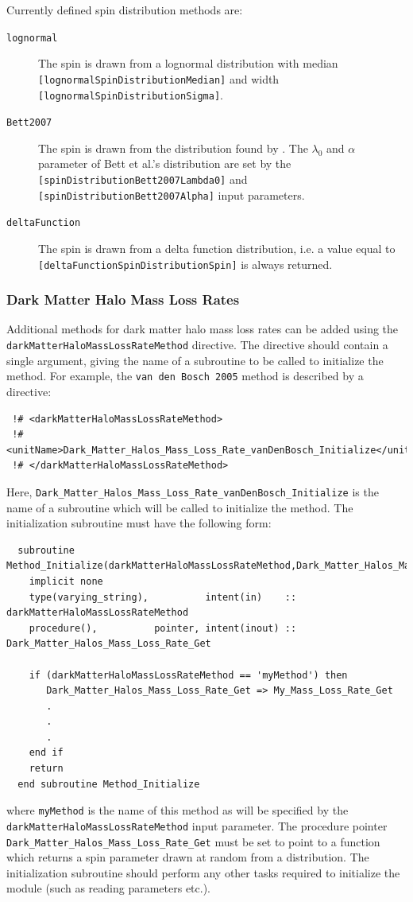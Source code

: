 Currently defined spin distribution methods are:
\begin{description}
 \item [{\tt lognormal}] The spin is drawn from a lognormal distribution with median {\tt [lognormalSpinDistributionMedian]} and width {\tt [lognormalSpinDistributionSigma]}.
 \item [{\tt Bett2007}] The spin is drawn from the distribution found by \cite{bett_spin_2007}. The $\lambda_0$ and $\alpha$ parameter of Bett et al.'s distribution are set by the {\tt [spinDistributionBett2007Lambda0]} and {\tt [spinDistributionBett2007Alpha]} input parameters.
 \item [{\tt deltaFunction}] The spin is drawn from a delta function distribution, i.e. a value equal to {\tt [deltaFunctionSpinDistributionSpin]} is always returned.
\end{description}

\subsubsection{Dark Matter Halo Mass Loss Rates}\label{sec:HaloMassLossRates}

Additional methods for dark matter halo mass loss rates can be added using the {\tt darkMatterHaloMassLossRateMethod} directive. The directive should contain a single argument, giving the name of a subroutine to be called to initialize the method. For example, the {\tt van den Bosch 2005} method is described by a directive:
\begin{verbatim}
 !# <darkMatterHaloMassLossRateMethod>
 !#  <unitName>Dark_Matter_Halos_Mass_Loss_Rate_vanDenBosch_Initialize</unitName>
 !# </darkMatterHaloMassLossRateMethod>
\end{verbatim}
Here, {\tt Dark\_Matter\_Halos\_Mass\_Loss\_Rate\_vanDenBosch\_Initialize} is the name of a subroutine which will be called to initialize the method. The initialization subroutine must have the following form:
\begin{verbatim}
  subroutine Method_Initialize(darkMatterHaloMassLossRateMethod,Dark_Matter_Halos_Mass_Loss_Rate_Get)
    implicit none
    type(varying_string),          intent(in)    :: darkMatterHaloMassLossRateMethod
    procedure(),          pointer, intent(inout) :: Dark_Matter_Halos_Mass_Loss_Rate_Get
    
    if (darkMatterHaloMassLossRateMethod == 'myMethod') then
       Dark_Matter_Halos_Mass_Loss_Rate_Get => My_Mass_Loss_Rate_Get
       .
       .
       .
    end if
    return
  end subroutine Method_Initialize
\end{verbatim}
where {\tt myMethod} is the name of this method as will be specified by the {\tt darkMatterHaloMassLossRateMethod} input parameter. The procedure pointer {\tt Dark\_Matter\_Halos\_Mass\_Loss\_Rate\_Get} must be set to point to a function which returns a spin parameter drawn at random from a distribution. The initialization subroutine should perform any other tasks required to initialize the module (such as reading parameters etc.).

